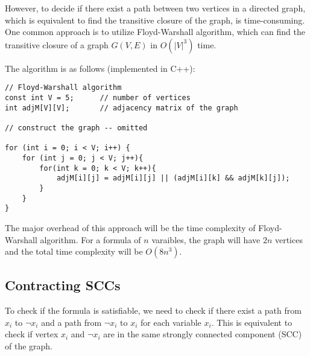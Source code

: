 \documentclass[a4paper,12pt]{article}
\newenvironment{claim}[1]{\par\noindent\underline{Claim:}\space#1}{}
\begin{document}
\vspace{0.4cm}

However, to decide if there exist a path between two vertices in a directed graph, which is equivalent to find the transitive closure of the graph, is time-consuming.
One common approach is to utilize Floyd-Warshall algorithm, which can find the transitive closure of a graph $G(V, E)$ in $O(|V|^3)$ time.

The algorithm is as follows (implemented in C++):
\begin{verbatim}
// Floyd-Warshall algorithm
const int V = 5;      // number of vertices
int adjM[V][V];       // adjacency matrix of the graph

// construct the graph -- omitted

for (int i = 0; i < V; i++) {
	for (int j = 0; j < V; j++){
		for(int k = 0; k < V; k++){
			adjM[i][j] = adjM[i][j] || (adjM[i][k] && adjM[k][j]);
		}
	}
}
\end{verbatim}

The major overhead of this approach will be the time complexity of Floyd-Warshall algorithm.
For a formula of $n$ varaibles, the graph will have $2n$ vertices and the total time complexity will be $O(8n^3)$.

\subsection{Contracting SCCs}

To check if the formula is satisfiable, we need to check if there exist a path from $x_i$ to $\neg x_i$ and a path from $\neg x_i$ to $x_i$ for each variable $x_i$.
This is equivalent to check if vertex $x_i$ and $\neg x_i$ are in the same strongly connected component (SCC) of the graph.

\end{document}
